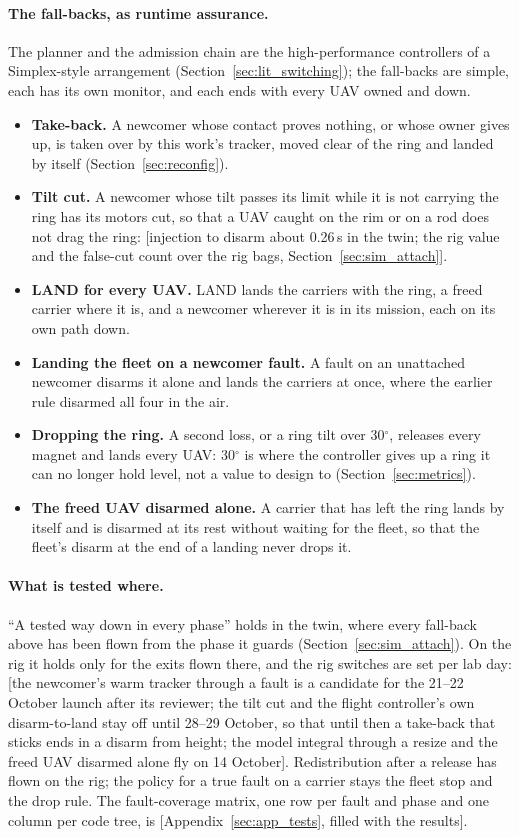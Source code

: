 \paragraph{The fall-backs, as runtime assurance.} The planner and the admission chain are the high-performance
controllers of a Simplex-style arrangement (Section~\ref{sec:lit_switching}); the fall-backs are simple, each has
its own monitor, and each ends with every UAV owned and down.
\begin{itemize}
    \item \textbf{Take-back.} A newcomer whose contact proves nothing, or whose owner gives up, is taken over by this
    work's tracker, moved clear of the ring and landed by itself (Section~\ref{sec:reconfig}).
    \item \textbf{Tilt cut.} A newcomer whose tilt passes its limit while it is not carrying the ring has its motors
    cut, so that a UAV caught on the rim or on a rod does not drag the ring: [injection to disarm about 0.26\,s in
    the twin; the rig value and the false-cut count over the rig bags, Section~\ref{sec:sim_attach}].
    \item \textbf{LAND for every UAV.} LAND lands the carriers with the ring, a freed carrier where it is, and a
    newcomer wherever it is in its mission, each on its own path down.
    \item \textbf{Landing the fleet on a newcomer fault.} A fault on an unattached newcomer disarms it alone and
    lands the carriers at once, where the earlier rule disarmed all four in the air.
    \item \textbf{Dropping the ring.} A second loss, or a ring tilt over 30$^\circ$, releases every magnet and lands
    every UAV: 30$^\circ$ is where the controller gives up a ring it can no longer hold level, not a value to design
    to (Section~\ref{sec:metrics}).
    \item \textbf{The freed UAV disarmed alone.} A carrier that has left the ring lands by itself and is disarmed at
    its rest without waiting for the fleet, so that the fleet's disarm at the end of a landing never drops it.
\end{itemize}

\paragraph{What is tested where.} ``A tested way down in every phase'' holds in the twin, where every fall-back
above has been flown from the phase it guards (Section~\ref{sec:sim_attach}). On the rig it holds only for the exits
flown there, and the rig switches are set per lab day: [the newcomer's warm tracker through a fault is a candidate
for the 21--22 October launch after its reviewer; the tilt cut and the flight controller's own disarm-to-land stay
off until 28--29 October, so that until then a take-back that sticks ends in a disarm from height; the model
integral through a resize and the freed UAV disarmed alone fly on 14 October]. Redistribution after a release has
flown on the rig; the policy for a true fault on a carrier stays the fleet stop and the drop rule. The
fault-coverage matrix, one row per fault and phase and one column per code tree, is [Appendix~\ref{sec:app_tests},
filled with the results].
